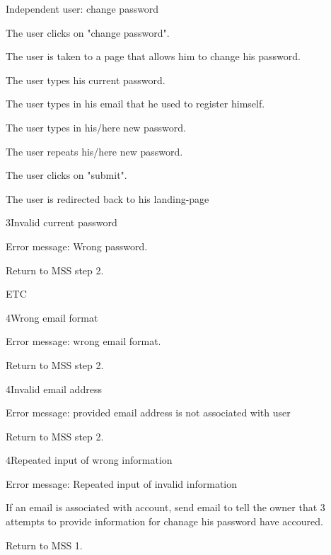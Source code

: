\begin{uc}{Independent user: change password}

    \begin{uc-mss}
    \item The user clicks on "change password".
    \item The user is taken to a page that allows him to change his password.
    \item The user types his current password.
    \item The user types in his email that he used to register himself.
    \item The user types in his/here new password.
    \item The user repeats his/here new password.
    \item The user clicks on "submit".
    \item The user is redirected back to his landing-page
    \end{uc-mss}

    \begin{uc-ext}
        \begin{uc-fail}{3}{Invalid current password}
        \item Error message: Wrong password.
        \item Return to MSS step 2.
        \item ETC
        \end{uc-fail}
        
        \begin{uc-fail}{4}{Wrong email format}
        \item Error message: wrong email format.
        \item Return to MSS step 2.
        \end{uc-fail}
        
        \begin{uc-fail}{4}{Invalid email address}
        \item Error message: provided email address is not associated with user
        \item Return to MSS step 2.
        \end{uc-fail}
        
        \begin{uc-fail}{4}{Repeated input of wrong information}
        \item Error message: Repeated input of invalid information
        \item If an email is associated with account, send email to tell the owner that 3 attempts to provide information for chanage his password have accoured.
        \item Return to MSS 1.
        \end{uc-fail}
        

\end{uc-ext}
\end{uc}
